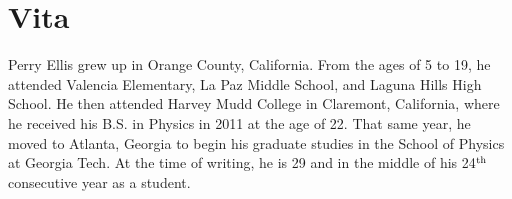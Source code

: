 \chapter*{Vita}
Perry Ellis grew up in Orange County, California.
From the ages of 5 to 19, he attended Valencia Elementary, La Paz Middle School, and Laguna Hills High School.
He then attended Harvey Mudd College in Claremont, California, where he received his B.S. in Physics in 2011 at the age of 22.
That same year, he moved to Atlanta, Georgia to begin his graduate studies in the School of Physics at Georgia Tech.
At the time of writing, he is 29 and in the middle of his 24$^{\rm th}$ consecutive year as a student. 
